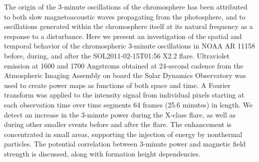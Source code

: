 The origin of the 3-minute oscillations of the chromosphere
has been attributed to both
slow magnetoacoustic waves
propagating from the photosphere,
and to
oscillations generated
within the chromosphere itself
at its natural frequency
as a response to a disturbance.
Here we present an investigation of the
spatial and temporal
behavior of the chromospheric 3-minute oscillations
in NOAA AR  11158
before, during, and after the
SOL2011-02-15T01:56 X2.2 flare.
Ultraviolet emission at 1600 and 1700 Angstroms
obtained at 24-second cadence
from the Atmospheric Imaging Assembly
on board the Solar Dynamics Observatory
was used to create power maps as functions of both space and time.
A Fourier transform was applied to
the intensity signal from individual pixels
starting at each observation time
over time segments 64 frames (25.6 minutes) in length.
We detect an increase in the 3-minute power
during the X-class flare, as well as during other smaller events before and
after the flare.
The enhancement is
concentrated in small areas,
supporting the injection of energy by nonthermal particles.
The potential correlation between 3-minute power and magnetic field strength
is discussed, along with formation height dependencies.
